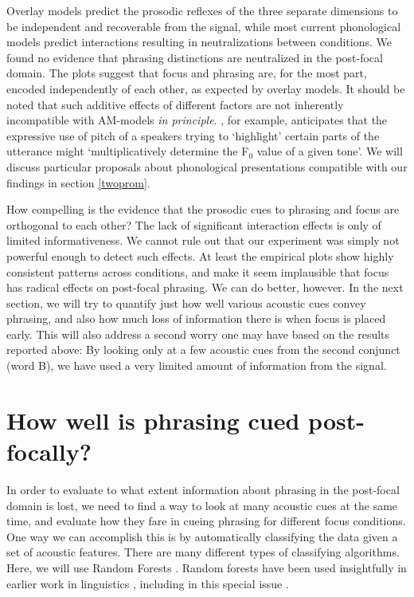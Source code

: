 \documentclass[preprint,review,12pt,authoryear,times]{elsarticle}
\begin{document}
Overlay models predict the prosodic reflexes of the three separate dimensions to be independent and recoverable from the signal, while most current phonological models predict interactions resulting in neutralizations between conditions. We found no evidence that phrasing distinctions are neutralized in the post-focal domain. The plots suggest that focus and phrasing are, for the most part, encoded independently of each other, as expected by overlay models. It should be noted  that such additive effects of different factors are not inherently incompatible with AM-models {\em in principle}. \citet[18]{pierr80}, for example, anticipates that the expressive use of pitch of a speakers trying to `highlight' certain parts of the utterance might `multiplicatively determine the F$_0$ value of a given tone'.  We will discuss particular proposals about phonological presentations compatible with our findings in section \ref{twoprom}. 

How compelling is the evidence that the prosodic cues to phrasing and focus are orthogonal to each other? The lack of significant interaction effects is only of limited informativeness. We cannot rule out that our experiment was simply not powerful enough to detect such effects. At least the empirical plots show highly consistent patterns across conditions, and make it seem implausible that focus has radical effects on post-focal phrasing. We can do better, however. In the next section, we will try to quantify just how well various acoustic cues convey phrasing, and also how much loss of information there is when focus is placed early. This will also address a second worry one may have based on the results reported above: By looking only at a few acoustic cues from the second conjunct (word B), we have used a very limited amount of information from the signal. 


\section{How well is phrasing cued post-focally?}
\label{forest}

In order to evaluate to what extent information about phrasing in the post-focal domain is lost, we need to find a way to look at many acoustic cues at the same time, and evaluate how they fare in cueing phrasing for different focus conditions. One way we can accomplish this is by automatically classifying the data given a set of acoustic features. There are many different types of classifying algorithms. Here, we will use Random Forests \citep{breim01,strob09}. Random forests have been used insightfully in earlier work in linguistics \citep{tagli12,tao18,bauma18}, including in this special issue \citep{wagne19}. 
\end{document}
